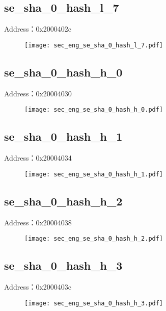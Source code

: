 \subsection{se\_sha\_0\_hash\_l\_7}
\label{sec_eng-se-sha-0-hash-l-7}
Address：0x2000402c
 \begin{figure}[H]
\texttt{[image: sec\_eng\_se\_sha\_0\_hash\_l\_7.pdf]}
\end{figure}

\subsection{se\_sha\_0\_hash\_h\_0}
\label{sec_eng-se-sha-0-hash-h-0}
Address：0x20004030
 \begin{figure}[H]
\texttt{[image: sec\_eng\_se\_sha\_0\_hash\_h\_0.pdf]}
\end{figure}

\subsection{se\_sha\_0\_hash\_h\_1}
\label{sec_eng-se-sha-0-hash-h-1}
Address：0x20004034
 \begin{figure}[H]
\texttt{[image: sec\_eng\_se\_sha\_0\_hash\_h\_1.pdf]}
\end{figure}

\subsection{se\_sha\_0\_hash\_h\_2}
\label{sec_eng-se-sha-0-hash-h-2}
Address：0x20004038
 \begin{figure}[H]
\texttt{[image: sec\_eng\_se\_sha\_0\_hash\_h\_2.pdf]}
\end{figure}

\subsection{se\_sha\_0\_hash\_h\_3}
\label{sec_eng-se-sha-0-hash-h-3}
Address：0x2000403c
 \begin{figure}[H]
\texttt{[image: sec\_eng\_se\_sha\_0\_hash\_h\_3.pdf]}
\end{figure}

